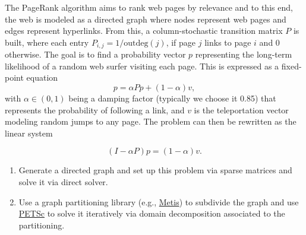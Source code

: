 \documentclass[11pt]{article}
\begin{document}
The PageRank algorithm aims to rank web pages by relevance and to this end, the
web is modeled as a directed graph where nodes represent web pages and edges
represent hyperlinks. From this, a column-stochastic transition matrix $P$ is
built, where each entry $P_{i,j} = 1/\text{outdeg}(j)$, if page $j$ links to
page $i$ and $0$ otherwise. The goal is to find a probability vector $p$
representing the long-term likelihood of a random web surfer visiting each page.
This is expressed as a fixed-point equation 
$$p = \alpha Pp + (1-\alpha)v,$$ 
with $\alpha \in (0,1)$ being a damping factor (typically we choose it 0.85)
that represents the probability of following a link, and $v$ is the
teleportation vector modeling random jumps to any page. The problem can then be
rewritten as the linear system 

$$(I - \alpha P)p = (1 - \alpha)v.$$ 

\begin{enumerate}
	\item Generate a directed graph and set up this problem via sparse
		matrices and solve it via direct solver.
	\item Use a graph partitioning library (e.g.,
		\href{https://en.wikipedia.org/wiki/METIS}{Metis}) to subdivide the
		graph and use \href{https://petsc.org}{PETSc} to solve it iteratively via domain
		decomposition associated to the partitioning.
\end{enumerate}
\end{document}
